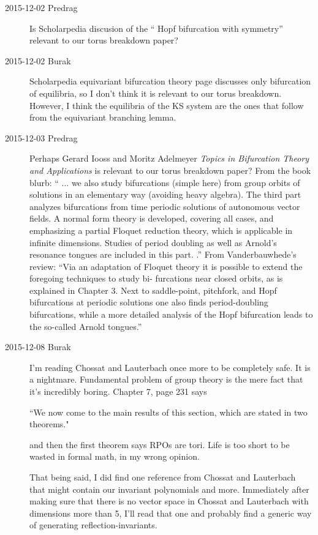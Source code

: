 \begin{description}
\item[2015-12-02 Predrag]
Is Scholarpedia discusion of the
``
{Hopf bifurcation} with  symmetry'' relevant to our
torus breakdown paper?

\item[2015-12-02 Burak]
Scholarpedia equivariant bifurcation theory page discusses only
bifurcation of equilibria, so I don't think it is relevant to our torus
breakdown. However, I think the equilibria of the KS system are the ones
that follow from the equivariant branching lemma.

\item[2015-12-03 Predrag]
Perhaps  Gerard Iooss and Moritz Adelmeyer
{\em Topics in Bifurcation Theory and Applications}
is relevant to our
torus breakdown paper? From the book blurb:
``
... we also study bifurcations (simple here) from group orbits of
solutions in an elementary way (avoiding heavy algebra). The third part
analyzes bifurcations from time periodic solutions of autonomous vector
fields. A normal form theory is developed, covering all cases, and
emphasizing a partial Floquet reduction theory, which is applicable in
infinite dimensions. Studies of period doubling as well as Arnold's
resonance tongues are included in this part.
.''
From
Vanderbauwhede's review:
``Via an adaptation of Floquet theory it is possible to extend the
foregoing techniques to study bi- furcations near closed orbits,
as is explained in Chapter 3. Next to saddle-point, pitchfork, and Hopf
bifurcations at periodic solutions one also finds period-doubling
bifurcations, while a more detailed analysis of the Hopf bifurcation
leads to the so-called Arnold tongues.''

\item[2015-12-08 Burak]
I'm reading Chossat and Lauterbach once more to be completely safe. It is
a nightmare. Fundamental problem of group theory is the mere fact that
it's incredibly boring. Chapter 7, page 231 says

``We now come to the main results of this section, which are stated in
two theorems."

and then the first theorem says RPOs are tori. Life is too short to be
wasted in formal math, in my wrong opinion.

That being said, I did find one reference from Chossat and Lauterbach
that might contain our invariant polynomials and more. Immediately after
making sure that there is no vector space in Chossat and Lauterbach with
dimensions more than 5, I'll read that one and probably find a generic
way of generating reflection-invariants.

\end{description}
\renewcommand{\ssp}{a}
